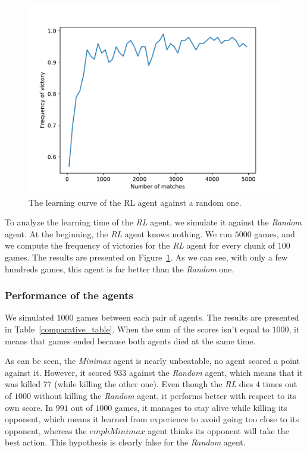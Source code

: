 \documentclass[journal, a4paper]{IEEEtran}
\begin{document}
\begin{figure}[h]
	\centering
    \includegraphics[width=0.95\columnwidth]{images/learning_curve_against_random.pdf}
    \caption{\label{learning_curve_against_random}The learning curve of the RL agent against a random one.}
\end{figure}

To analyze the learning time of the \emph{RL} agent, we simulate it against the \emph{Random} agent.
At the beginning, the \emph{RL} agent knows nothing.
We run $5000$ games, and we compute the frequency of victories for the \emph{RL} agent for every chunk of $100$ games.
The results are presented on Figure~\ref{learning_curve_against_random}.
As we can see, with only a few hundreds games, this agent is far better than the \emph{Random} one.

\subsubsection{Performance of the agents}

We simulated $1000$ games between each pair of agents.
The results are presented in Table~\ref{comparative_table}.
When the sum of the scores isn't equal to $1000$, it means that games ended because both agents died at the same time.

As can be seen, the \emph{Minimax} agent is nearly unbeatable, no agent scored a point against it.
However, it scored $933$ against the \emph{Random} agent, which means that it was killed $77$ (while killing the other one).
Even though the \emph{RL} dies $4$ times out of $1000$ without killing the \emph{Random} agent, it performs better with respect to its own score.
In $991$ out of $1000$ games, it manages to stay alive while killing its opponent, which means it learned from experience to avoid going too close to its opponent, whereas the $emph{Minimax}$ agent thinks its opponent will take the best action.
This hypothesis is clearly false for the \emph{Random} agent.
\end{document}

